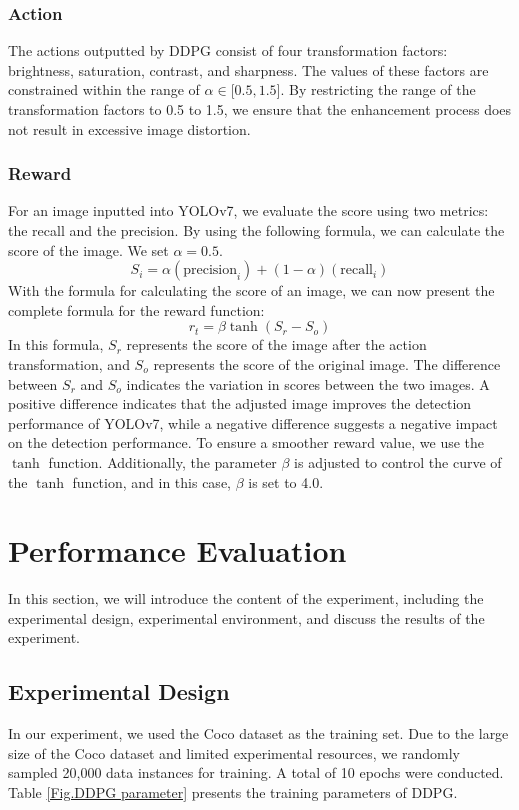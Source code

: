 \documentclass{PHlab-thesis}
\begin{document}
\subsection{Action}
The actions outputted by DDPG consist of four transformation factors: brightness, saturation, contrast, and sharpness. The values of these factors are constrained within the range of $\alpha\in\lbrack0.5,1.5\rbrack$. By restricting the range of the transformation factors to 0.5 to 1.5, we ensure that the enhancement process does not result in excessive image distortion.

\subsection{Reward}
For an image inputted into YOLOv7, we evaluate the score using two metrics: the recall and the precision. By using the following formula, we can calculate the score of the image. We set $\alpha=0.5$.
\begin{equation*}
S_i=\alpha({\text{precision}}_i)+(1-\alpha)({\text{recall}}_i)
\end{equation*}
With the formula for calculating the score of an image, we can now present the complete formula for the reward function:
\begin{equation*}
\label{reward function}
r_t={\beta\tanh(S_r-S_o)}
\end{equation*}
In this formula, $S_r$ represents the score of the image after the action transformation, and $S_o$ represents the score of the original image. The difference between $S_r$ and $S_o$ indicates the variation in scores between the two images. A positive difference indicates that the adjusted image improves the detection performance of YOLOv7, while a negative difference suggests a negative impact on the detection performance. To ensure a smoother reward value, we use the $\tanh$ function. Additionally, the parameter $\beta$ is adjusted to control the curve of the $\tanh$ function, and in this case, $\beta$ is set to 4.0.


\chapter{Performance Evaluation}
In this section, we will introduce the content of the experiment, including the experimental design, experimental environment, and discuss the results of the experiment.

\section{Experimental Design}
In our experiment, we used the Coco dataset \cite{lin2014microsoft} as the training set. Due to the large size of the Coco dataset and limited experimental resources, we randomly sampled 20,000 data instances for training. A total of 10 epochs were conducted. Table \ref{Fig.DDPG parameter} presents the training parameters of DDPG.
\end{document}
